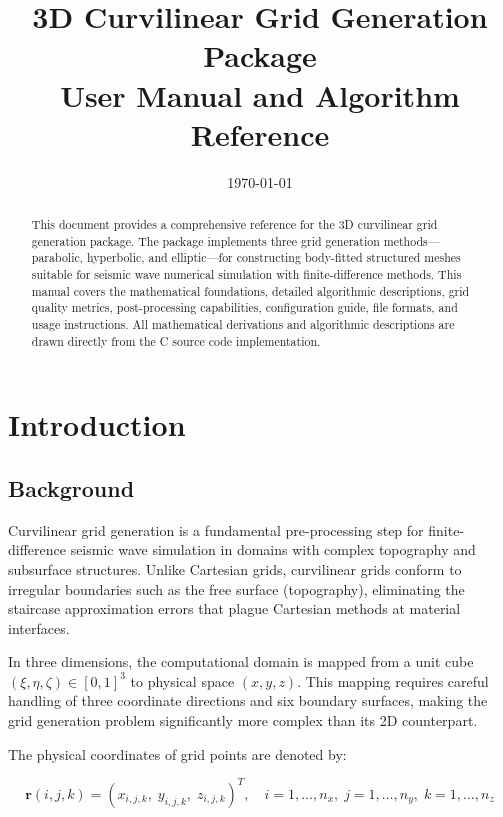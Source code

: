 \documentclass[11pt,a4paper]{report}
\title{\textbf{3D Curvilinear Grid Generation Package}\\[0.5em]
\large User Manual and Algorithm Reference}
\author{}
\date{\today}
\newcommand{\rvec}{\bm{r}}
\begin{document}
\maketitle

\begin{abstract}
This document provides a comprehensive reference for the 3D curvilinear grid generation package. The package implements three grid generation methods---parabolic, hyperbolic, and elliptic---for constructing body-fitted structured meshes suitable for seismic wave numerical simulation with finite-difference methods. This manual covers the mathematical foundations, detailed algorithmic descriptions, grid quality metrics, post-processing capabilities, configuration guide, file formats, and usage instructions. All mathematical derivations and algorithmic descriptions are drawn directly from the C source code implementation.
\end{abstract}

\tableofcontents

\chapter{Introduction}

\section{Background}

Curvilinear grid generation is a fundamental pre-processing step for finite-difference seismic wave simulation in domains with complex topography and subsurface structures. Unlike Cartesian grids, curvilinear grids conform to irregular boundaries such as the free surface (topography), eliminating the staircase approximation errors that plague Cartesian methods at material interfaces.

In three dimensions, the computational domain is mapped from a unit cube $(\xi, \eta, \zeta) \in [0,1]^3$ to physical space $(x, y, z)$. This mapping requires careful handling of three coordinate directions and six boundary surfaces, making the grid generation problem significantly more complex than its 2D counterpart.

The physical coordinates of grid points are denoted by:

\begin{equation}
    \rvec(i,j,k) = (x_{i,j,k},\; y_{i,j,k},\; z_{i,j,k})^T, \quad
    i = 1,\dots,n_x,\; j = 1,\dots,n_y,\; k = 1,\dots,n_z
\end{equation}
\end{document}
